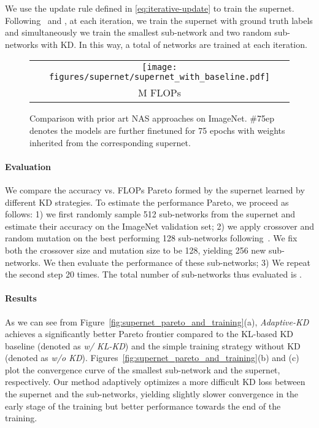\documentclass{article}
\begin{document}
We use the update rule defined in \eqref{eq:iterative-update} to train the supernet.
Following~\citet{wang2020attentivenas} and \citet{yu2020bignas}, 
at each iteration, 
we train the supernet with ground truth labels and simultaneously 
we train the smallest sub-network and two random sub-networks with KD. 
In this way, a total of  networks are trained at each iteration.

\begin{figure}[h]
\centering
\begin{tabular}{c}
\raisebox{2.5em}{\rotatebox{90}{Top-1 validation accuracy}}
\texttt{[image: figures/supernet/supernet\_with\_baseline.pdf]}
\\
\small M FLOPs\\
\end{tabular}
\caption{Comparison with prior art NAS approaches on ImageNet. 
\#75ep denotes the models are further finetuned for 75 epochs with weights inherited from the corresponding supernet.}
\label{fig:compare_with_sota}
\end{figure}

\paragraph{Evaluation}
We compare the accuracy vs. FLOPs Pareto formed by the supernet learned by different KD strategies. 
To estimate the performance Pareto, we proceed as follows: 
1) we first randomly sample 512 sub-networks from the supernet and estimate their accuracy on the ImageNet validation set;  
2) we apply crossover and random mutation on the best performing 128 sub-networks following~\citet{wang2020attentivenas}. 
We fix both the crossover size and mutation size to be 128, yielding 256 new sub-networks. We then evaluate the performance of these sub-networks; 
3) We repeat the second step 20 times. 
The total number of sub-networks thus evaluated is . 


\paragraph{Results}
As we can see from Figure~\ref{fig:supernet_pareto_and_training}(a), 
\emph{Adaptive-KD} achieves a significantly better Pareto frontier compared to the KL-based KD baseline (denoted as \emph{w/ KL-KD}) and 
the simple training strategy without KD (denoted as \emph{w/o KD}).
Figures~\ref{fig:supernet_pareto_and_training}(b) and (c) plot the convergence curve of the smallest sub-network and the supernet, respectively. 
Our method adaptively optimizes a more difficult KD loss between the supernet and the sub-networks, yielding slightly slower convergence in the early stage of the training but better performance towards the end of the training. 
\end{document}
